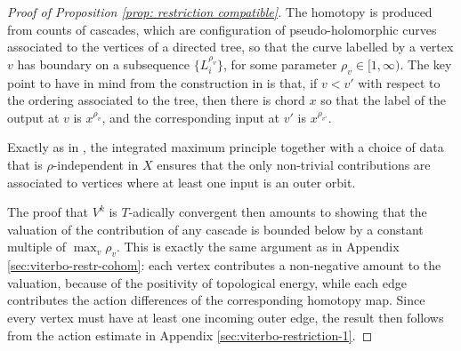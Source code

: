 \documentclass{article}
\theoremstyle{plain}%
\theoremstyle{definition}
\numberwithin{equation}{section}
\numberwithin{figure}{section}
\begin{document}
\begin{proof}[Proof of Proposition \ref{prop: restriction compatible}]
The homotopy is produced from counts of cascades, which are configuration of pseudo-holomorphic curves associated to the vertices of a directed tree, so that the curve labelled by a vertex $v$ has boundary on a subsequence $\{L_i^{\rho_v}\}$, for some parameter $\rho_v \in [1,\infty)$. The key point to have in mind from the construction in \cite{AS} is that, if $v < v'$ with respect to the ordering associated to the tree, then there is chord $x$ so that the label of the output at $v$ is $x^{\rho_v}$, and the corresponding input at $v'$ is $x^{\rho_{v'}}$.


Exactly as in \cite{AS}, the integrated maximum principle together with a choice of data that is $\rho$-independent in $X$  ensures that the only non-trivial contributions are associated to vertices where at least one input is an outer orbit.


The proof that $V^k$ is $T$-adically convergent then amounts to showing that the valuation of the contribution of any cascade is bounded below by a constant multiple of $\max_{v} \rho_v$. This is exactly the same argument as in Appendix \ref{sec:viterbo-restr-cohom}: each vertex contributes a non-negative amount to the valuation, because of the positivity of topological energy, while each edge contributes the action differences of the corresponding homotopy map. Since every vertex must have at least one incoming outer edge, the result then follows from the action estimate in Appendix \ref{sec:viterbo-restriction-1}.





\end{proof}
\end{document}
